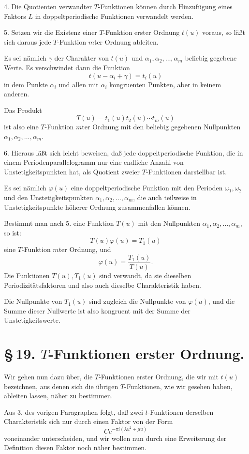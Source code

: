 \documentclass[11pt]{article}
\begin{document}
4. Die Quotienten verwandter $T$-Funktionen können durch Hinzufügung eines Faktors $L$ in doppeltperiodische Funktionen verwandelt werden.

5. Setzen wir die Existenz einer $T$-Funktion erster Ordnung $t(u)$ voraus, so läßt sich daraus jede $T$-Funktion $m$ter Ordnung ableiten.

Es sei nämlich $\gamma$ der Charakter von $t(u)$ und $\alpha_1,\alpha_2,\ldots,\alpha_m$ beliebig gegebene Werte. Es verschwindet dann die Funktion
\[
t(u-\alpha_i+\gamma)=t_i(u)
\]
in dem Punkte $\alpha_i$ und allen mit $\alpha_i$ kongruenten Punkten, aber in keinem anderen.

Das Produkt
\[
T(u)=t_1(u)t_2(u)\cdots t_m(u)
\]
ist also eine $T$-Funktion $m$ter Ordnung mit den beliebig gegebenen Nullpunkten $\alpha_1,\alpha_2,\ldots,\alpha_m$.

6. Hieraus läßt sich leicht beweisen, daß jede doppeltperiodische Funktion, die in einem Periodenparallelogramm nur eine endliche Anzahl von Unstetigkeitspunkten hat, als Quotient zweier $T$-Funktionen darstellbar ist.

Es sei nämlich $\varphi(u)$ eine doppeltperiodische Funktion mit den Perioden $\omega_1,\omega_2$ und den Unstetigkeitspunkten $\alpha_1,\alpha_2,\ldots,\alpha_m$, die auch teilweise in Unstetigkeitspunkte höherer Ordnung zusammenfallen können.

Bestimmt man nach 5. eine Funktion $T(u)$ mit den Nullpunkten $\alpha_1,\alpha_2,\ldots,\alpha_m$, so ist:
\[
T(u)\varphi(u)=T_1(u)
\]
eine $T$-Funktion $m$ter Ordnung, und
\[
\varphi(u)=\frac{T_1(u)}{T(u)}.
\]
Die Funktionen $T(u),T_1(u)$ sind verwandt, da sie dieselben Periodizitätsfaktoren und also auch dieselbe Charakteristik haben.

Die Nullpunkte von $T_1(u)$ sind zugleich die Nullpunkte von $\varphi(u)$, und die Summe dieser Nullwerte ist also kongruent mit der Summe der Unstetigkeitswerte.

\section*{\S\,19. $T$-Funktionen erster Ordnung.}

Wir gehen nun dazu über, die $T$-Funktionen erster Ordnung, die wir mit $t(u)$ bezeichnen, aus denen sich die übrigen $T$-Funktionen, wie wir gesehen haben, ableiten lassen, näher zu bestimmen.

Aus 3. des vorigen Paragraphen folgt, daß zwei $t$-Funktionen derselben Charakteristik sich nur durch einen Faktor von der Form
\[
Ce^{-\pi i(\lambda u^2+\mu u)}
\]
voneinander unterscheiden, und wir wollen nun durch eine Erweiterung der Definition diesen Faktor noch näher bestimmen.
\end{document}
